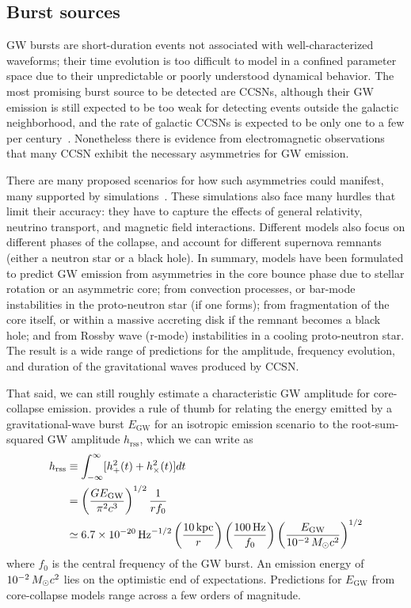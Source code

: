 \subsection{Burst sources}

GW bursts are short-duration events not associated with well-characterized waveforms; their time evolution is too difficult to model in a confined parameter space due to their unpredictable or poorly understood dynamical behavior.
The most promising burst source to be detected are \acp{CCSN}, although their \ac{GW} emission is still expected to be too weak for detecting events outside the galactic neighborhood, and the rate of galactic \acp{CCSN} is expected to be only one to a few per century~\citep{Adams_2013, Maoz_2010}.
Nonetheless there is evidence from electromagnetic observations that many CCSN exhibit the necessary asymmetries for GW emission.

There are many proposed scenarios for how such asymmetries could manifest, many supported by simulations~\citep{Fryer_2011, Fryer_2002}.
These simulations also face many hurdles that limit their accuracy: they have to capture the effects of general relativity, neutrino transport, and magnetic field interactions.
Different models also focus on different phases of the collapse, and account for different supernova remnants (either a neutron star or a black hole).
In summary, models have been formulated to predict GW emission from asymmetries in the core bounce phase due to stellar rotation or an asymmetric core; from convection processes, or bar-mode instabilities in the proto-neutron star (if one forms); from fragmentation of the core itself, or within a massive accreting disk if the remnant becomes a black hole; and from Rossby wave (r-mode) instabilities in a cooling proto-neutron star.
The result is a wide range of predictions for the amplitude, frequency evolution, and duration of the gravitational waves produced by CCSN.

That said, we can still roughly estimate a characteristic GW amplitude for core-collapse emission.
\citet{Sutton_2013} provides a rule of thumb for relating the energy emitted by a gravitational-wave burst $E_{\mathrm{GW}}$ for an isotropic emission scenario to the root-sum-squared GW amplitude $h_{\mathrm{rss}}$, which we can write as
\begin{align}
	\label{gw-hrss}
	h_{\mathrm{rss}}
		&\equiv \int_{-\infty}^{\infty} [h_+^2(t) + h_{\times}^2(t)] dt\\
		\label{gw-egw}
		&= \left( \frac{G E_{\mathrm{GW}}}{\pi^2 c^3} \right)^{1/2} \frac{1}{r f_0}\\
		&\simeq 6.7 \times 10^{-20}\,\mathrm{Hz}^{-1/2}
			\left( \frac{10\,\mathrm{kpc}}{r} \right)
			\left( \frac{100\,\mathrm{Hz}}{f_0} \right)
			\left( \frac{E_{\mathrm{GW}}}{10^{-2}\,M_{\odot} c^2} \right)^{1/2}
\end{align}
where $f_0$ is the central frequency of the GW burst.
An emission energy of $10^{-2}\,M_{\odot} c^2$ lies on the optimistic end of expectations.
Predictions for $E_{\mathrm{GW}}$ from core-collapse models range across a few orders of magnitude.

